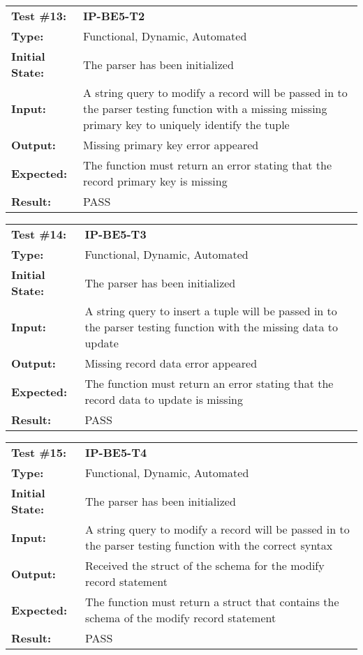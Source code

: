 \documentclass[12pt, titlepage]{article}
\begin{document}
\begin{mdframed}[linewidth=1pt]
\begin{tabularx}{\textwidth}{@{}p{3cm}X@{}}
{\bf Test \#13:} & {\bf IP-BE5-T2}\\[\baselineskip]
{\bf Type:} & Functional, Dynamic, Automated \\[0.5\baselineskip]
{\bf Initial State:} & The parser has been initialized \\[\baselineskip]
{\bf Input:} & A string query to modify a record will be passed in to the parser testing function with a missing missing primary key to uniquely identify the tuple \\[\baselineskip]
{\bf Output:} & Missing primary key error appeared \\[\baselineskip]
{\bf Expected:} & The function must return an error stating that the record primary key is missing \\[\baselineskip]
{\bf Result:} & PASS
\end{tabularx}
\end{mdframed}

\begin{mdframed}[linewidth=1pt]
\begin{tabularx}{\textwidth}{@{}p{3cm}X@{}}
{\bf Test \#14:} & {\bf IP-BE5-T3}\\[\baselineskip]
{\bf Type:} & Functional, Dynamic, Automated \\[0.5\baselineskip]
{\bf Initial State:} & The parser has been initialized \\[\baselineskip]
{\bf Input:} & A string query to insert a tuple will be passed in to the parser testing function with the missing data to update \\[\baselineskip]
{\bf Output:} & Missing record data error appeared \\[\baselineskip]
{\bf Expected:} & The function must return an error stating that the record data to update is missing \\[\baselineskip]
{\bf Result:} & PASS
\end{tabularx}
\end{mdframed}

\begin{mdframed}[linewidth=1pt]
\begin{tabularx}{\textwidth}{@{}p{3cm}X@{}}
{\bf Test \#15:} & {\bf IP-BE5-T4}\\[\baselineskip]
{\bf Type:} & Functional, Dynamic, Automated \\[0.5\baselineskip]
{\bf Initial State:} & The parser has been initialized \\[\baselineskip]
{\bf Input:} & A string query to modify a record will be passed in to the parser testing function with the correct syntax \\[\baselineskip]
{\bf Output:} & Received the struct of the schema for the modify record statement \\[\baselineskip]
{\bf Expected:} & The function must return a struct that contains the schema of the modify record statement \\[\baselineskip]
{\bf Result:} & PASS
\end{tabularx}
\end{mdframed}
\end{document}
